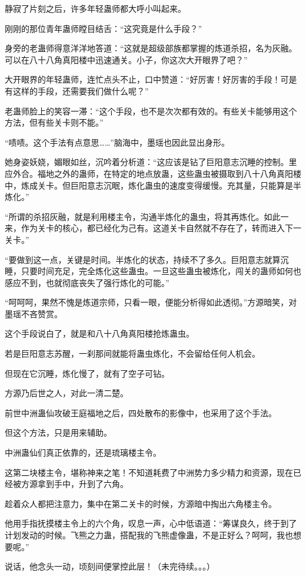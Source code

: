 \begin{this_body}
静寂了片刻之后，许多年轻蛊师都大呼小叫起来。

刚刚的那位青年蛊师瞠目结舌：“这究竟是什么手段？”

身旁的老蛊师得意洋洋地答道：“这就是超级部族都掌握的炼道杀招，名为灰融。可以在八十八角真阳楼中迅速通关。小子，你这次大开眼界了吧？”

大开眼界的年轻蛊师，连忙点头不止，口中赞道：“好厉害！好厉害的手段！可是有这样的手段，还需要我们做什么呢？”

老蛊师脸上的笑容一滞：“这个手段，也不是次次都有效的。有些关卡能够用这个方法，但有些关卡则不能。”

“啧啧。这个手法有点意思……”脑海中，墨瑶也因此显出身形。

她身姿妖娆，媚眼如丝，沉吟着分析道：“这应该是钻了巨阳意志沉睡的控制。里应外合。福地之外的蛊师，在特定的地点放蛊，这些蛊虫被摄取到八十八角真阳楼中，炼成关卡。但巨阳意志沉眠，炼化蛊虫的速度变得缓慢。充其量，只能算是半炼化。”

“所谓的杀招灰融，就是利用楼主令，沟通半炼化的蛊虫，将其再炼化。如此一来，作为关卡的核心，都已经化为己有。这道关卡自然就不存在了，转而进入下一关卡。”

“要做到这一点，关键是时间。半炼化的状态，持续不了多久。巨阳意志就算沉睡，只要时间充足，完全炼化这些蛊虫。一旦这些蛊虫被炼化，闯关的蛊师如何也感应不到，也就彻底丧失了强行炼化的可能。”

“呵呵呵，果然不愧是炼道宗师，只看一眼，便能分析得如此透彻。”方源暗笑，对墨瑶不吝赞赏。

这个手段说白了，就是和八十八角真阳楼抢炼蛊虫。

若是巨阳意志苏醒，一刹那间就能将蛊虫炼化，不会留给任何人机会。

但现在它沉睡，炼化慢了，就有了空子可钻。

方源乃后世之人，对此一清二楚。

前世中洲蛊仙攻破王庭福地之后，四处散布的影像中，也采用了这个手法。

但这个方法，只是用来辅助。

中洲蛊仙们真正依靠的，还是琉璃楼主令。

这第二块楼主令，堪称神来之笔！不知道耗费了中洲势力多少精力和资源，现在已经被方源拿到手中，升到了六角。

趁着众人都把注意力，集中在第二关卡的时候，方源暗中掏出六角楼主令。

他用手指抚摸楼主令上的六个角，叹息一声，心中低语道：“筹谋良久，终于到了计划发动的时候。飞熊之力蛊，搭配我的飞熊虚像蛊，不是正好么？呵呵，我也想要呢。”

说话，他念头一动，顷刻间便掌控此层！（未完待续。。。）

\end{this_body}

